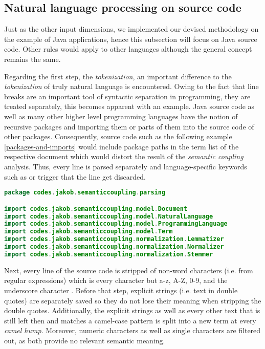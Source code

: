 \documentclass[12pt,a4paper]{report}
\begin{document}
\subsection{Natural language processing on source code}

Just as the other input dimensions, we implemented our devised methodology
on the example of Java applications, hence this subsection will focus on
Java source code. Other rules would apply to other languages although
the general concept remains the same.

Regarding the first step, the \textit{tokenization}, an important difference to
the \textit{tokenization} of truly natural language is encountered.
Owing to the fact that line breaks are an important tool of syntactic separation
in programming, they are treated separately, this becomes apparent with an example.
Java source code as well as many other higher level programming languages have
the notion of recursive packages and importing them or parts of them into the
source code of other packages.
Consequently, source code such as the following example \ref{packages-and-imports}
would include package paths in the term list of the respective document
which would distort the result of the \textit{semantic coupling} analysis.
Thus, every line is parsed separately and language-specific keywords such as
 or  trigger that the line get discarded.

\smaller
\begin{lstlisting}[caption=Packages and imports in Java, label=packages-and-imports, language=Java, breaklines=true]
package codes.jakob.semanticcoupling.parsing

import codes.jakob.semanticcoupling.model.Document
import codes.jakob.semanticcoupling.model.NaturalLanguage
import codes.jakob.semanticcoupling.model.ProgrammingLanguage
import codes.jakob.semanticcoupling.model.Term
import codes.jakob.semanticcoupling.normalization.Lemmatizer
import codes.jakob.semanticcoupling.normalization.Normalizer
import codes.jakob.semanticcoupling.normalization.Stemmer
\end{lstlisting}
\normalsize

Next, every line of the source code is stripped of non\hyp word characters
(i.e.  from regular expressions) which is every character
but a-z, A-Z, 0-9, and the underscore character \cite{ieee1992posix}.
Before that step, explicit strings (i.e. text in double quotes) are separately
saved so they do not lose their meaning when stripping the double quotes.
Additionally, the explicit strings as well as every other text that is still
left then and matches a camel-case pattern is split into a new term at every
\textit{camel hump}. Moreover, numeric characters as well as single characters
are filtered out, as both provide no relevant semantic meaning.
\end{document}
